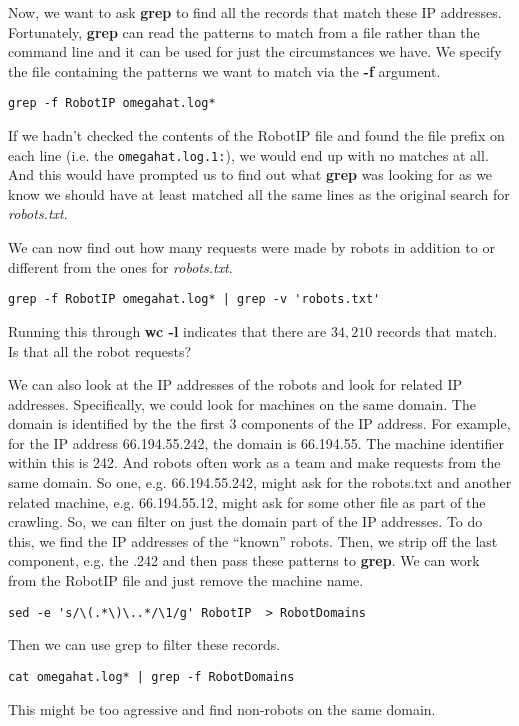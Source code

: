 \documentclass[10pt]{article}
\def\executable#1{\textbf{#1}}
\begin{document}
\begin{enumerate}
Now, we want to ask \executable{grep} to find all the records that match these
IP addresses.
Fortunately, \executable{grep} can read the patterns to match 
from a file rather than the command line and it can be used
for just the circumstances we have.
We specify the file containing the patterns we want to match
via the \textbf{-f} argument.
\begin{verbatim}
grep -f RobotIP omegahat.log*
\end{verbatim}
If we hadn't checked the contents of the RobotIP file and found the file prefix on each line (i.e.
the \texttt{omegahat.log.1:}), we would end up with no matches at all. And this would have prompted
us to find out what \executable{grep} was looking for as we know we should have at least matched all
the same lines as the original search for \textsl{robots.txt}.

We can now find out how many requests were made by robots in addition
to 
or different from the
ones for \textsl{robots.txt}.
\begin{verbatim}
grep -f RobotIP omegahat.log* | grep -v 'robots.txt'
\end{verbatim}
Running this through \executable{wc -l} indicates that there are $34,210$
records that match.
Is that all the robot requests?

We can also look at the IP addresses of the robots and look for
related IP addresses.  Specifically, we could look for machines on the
same domain. The domain is identified by the the first 3 components of
the IP address.  For example, for the IP address 66.194.55.242, the
domain is 66.194.55. The machine identifier within this is 242.  And
robots often work as a team and make requests from the same domain.
So one, e.g. 66.194.55.242, might ask for the robots.txt and another
related machine, e.g. 66.194.55.12, might ask for some other file as
part of the crawling.  So, we can filter on just the domain part of
the IP addresses.  To do this, we find the IP addresses of the
``known'' robots.  Then, we strip off the last component, e.g. the
.242 and then pass these patterns to \executable{grep}.  We can work
from the RobotIP file and just remove the machine name.
\begin{verbatim}
sed -e 's/\(.*\)\..*/\1/g' RobotIP  > RobotDomains
\end{verbatim}
Then we can use grep to filter these records.
\begin{verbatim}
cat omegahat.log* | grep -f RobotDomains 
\end{verbatim}
This might be too agressive and find non-robots 
on the same domain.


\end{enumerate}
\end{document}
